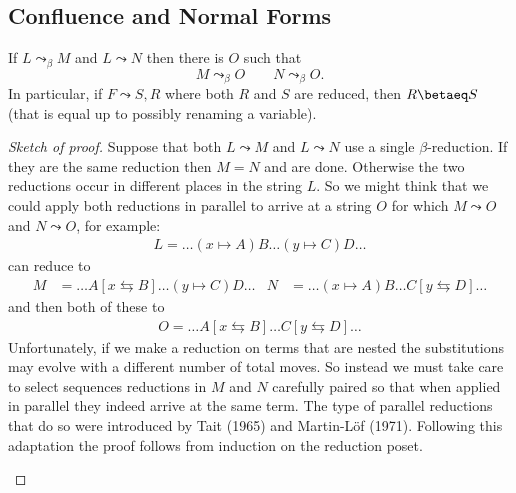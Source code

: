 \subsection{Confluence and Normal Forms}
\begin{theorem}
    If $L\leadsto_{\beta} M$ and $L\leadsto N$ then there is $O$ such that 
    \[M\leadsto_{\beta} O\qquad N\leadsto_{\beta} O.\] 
    In particular, if $F\leadsto S,R$ where both $R$ and $S$ are reduced,
    then $R\betaeq S$ (that is equal up to possibly renaming a variable).
\end{theorem}
\begin{proof}[Sketch of proof]
Suppose that both $L\leadsto M$ and $L\leadsto N$ use a single $\beta$-reduction.
If they are the same reduction then $M=N$ and are done.  Otherwise 
the two reductions occur in different places in the string $L$.  So we might 
think that we could apply both reductions in parallel to arrive at a string $O$
for which $M\leadsto O$ and $N\leadsto O$, for example:
\begin{align*}
    L = \ldots (x\mapsto A)B\ldots (y\mapsto C)D\ldots 
\end{align*}
can reduce to 
\begin{align*}
    M & = \ldots A[x\leftrightarrows B]\ldots (y\mapsto C)D\ldots 
    &
    N & =  \ldots (x\mapsto A)B\ldots C[y\leftrightarrows D]\ldots 
\end{align*}
and then both of these to 
\begin{align*}
O =  \ldots A[x\leftrightarrows B]\ldots C[y\leftrightarrows D]\ldots 
\end{align*}
Unfortunately, if we make a reduction on terms that are nested 
the substitutions may evolve with a different number of total moves.
So instead we must take care to select sequences reductions in $M$ and $N$ carefully 
paired so that when applied in parallel they indeed arrive at the same term.  
The type of parallel reductions that do so were introduced by Tait (1965) and
Martin-L\"of (1971). Following this adaptation the proof follows from induction
on the reduction poset.
\begin{center}
\end{center}
\end{proof}
